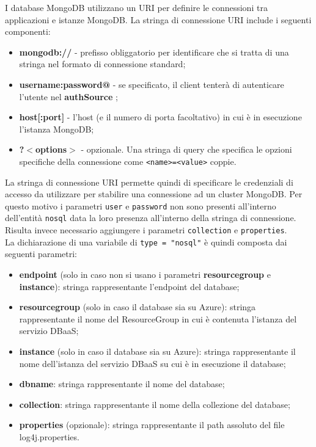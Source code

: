 I database MongoDB utilizzano un URI per definire le connessioni tra applicazioni e istanze MongoDB. La stringa di connessione URI include i seguenti componenti:
\begin{itemize}
    \item \textbf{mongodb://} - prefisso obliggatorio per identificare che si tratta di una stringa nel formato di connessione standard;
    \item \textbf{username:password@} - se specificato, il client tenterà di autenticare l'utente nel \textbf{authSource} \cite{authSource};
    \item \textbf{host[:port]} - l'host (e il numero di porta facoltativo) in cui è in esecuzione l'istanza MongoDB;
    \item \textbf{?$<$options$>$} - opzionale. Una stringa di query che specifica le opzioni specifiche della connessione come \verb|<name>=<value>| coppie.
\end{itemize}
La stringa di connessione URI permette quindi di specificare le credenziali di accesso da utilizzare per stabilire una connessione ad un cluster MongoDB. Per questo motivo i parametri \verb|user| e \verb|password| non sono presenti all'interno dell'entità \verb|nosql| data la loro presenza all'interno della stringa di connessione. Risulta invece necessario aggiungere i parametri \verb|collection| e \verb|properties|. \\
La dichiarazione di una variabile di \verb|type = "nosql"| è quindi composta dai seguenti parametri:
\begin{itemize}
    \item \textbf{endpoint} (solo in caso non si usano i parametri \textbf{resource\textunderscore group} e \textbf{instance}): stringa rappresentante l'endpoint del database;
    \item \textbf{resource\textunderscore group} (solo in caso il database sia su Azure): stringa rappresentante il nome del ResourceGroup in cui è contenuta l’istanza del servizio DBaaS;
    \item \textbf{instance} (solo in caso il database sia su Azure): stringa rappresentante il nome dell’istanza del servizio DBaaS su cui è in esecuzione il database;
    \item \textbf{db\textunderscore name}: stringa rappresentante il nome del database;
    \item \textbf{collection}: stringa rappresentante il nome della collezione del database;
    \item \textbf{properties} (opzionale): stringa rappresentante il path assoluto del file log4j.properties.
\end{itemize}  
